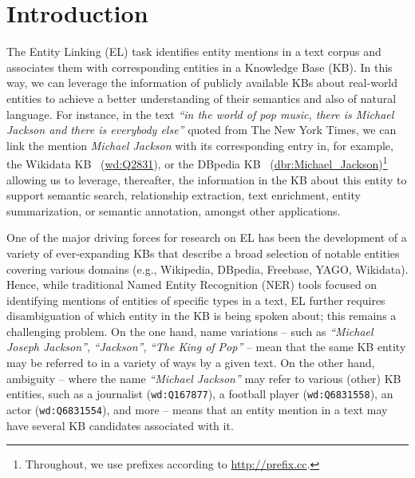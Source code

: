 \documentclass{llncs}
\begin{document}
\section{Introduction} 
\label{sec:intro}


The Entity Linking (EL) task identifies entity mentions in a text corpus and associates them with corresponding entities in a Knowledge Base (KB). In this way, we can leverage the information of publicly available KBs about real-world entities to achieve a better understanding of their semantics and also of natural language. For instance, in the text \textit{``in the world of pop music, there is Michael Jackson and there is everybody else''} quoted from The New York Times, we can link the mention \textit{Michael Jackson} with its corresponding entry in, for example, the Wikidata KB~\cite{Wikidata_vrandevcic2014wikidata} (\url{wd:Q2831}), or the DBpedia KB~\cite{dbpedia-lehmann2015dbpedia} (\url{dbr:Michael_Jackson})\footnote{Throughout, we use prefixes according to \url{http://prefix.cc}.} allowing us to leverage, thereafter, the information in the KB about this entity to support semantic search, relationship extraction, text enrichment, entity summarization, or semantic annotation, amongst other applications.

One of the major driving forces for research on EL has been the development of a variety of ever-expanding KBs that describe a broad selection of notable entities covering various domains (e.g., Wikipedia, DBpedia, Freebase, YAGO, Wikidata). Hence, while traditional Named Entity Recognition (NER) tools focused on identifying mentions of entities of specific types in a text, EL further requires disambiguation of which entity in the KB is being spoken about; this remains a challenging problem. On the one hand, name variations -- such as \textit{``Michael Joseph Jackson''}, \textit{``Jackson''}, \textit{``The King of Pop''} -- mean that the same KB entity may be referred to in a variety of ways by a given text. On the other hand, ambiguity -- where the name \textit{``Michael Jackson''} may refer to various (other) KB entities, such as a journalist (\texttt{wd:Q167877}), a football player (\texttt{wd:Q6831558}), an actor (\texttt{wd:Q6831554}), and more -- means that an entity mention in a text may have several KB candidates associated with it.
\end{document}
